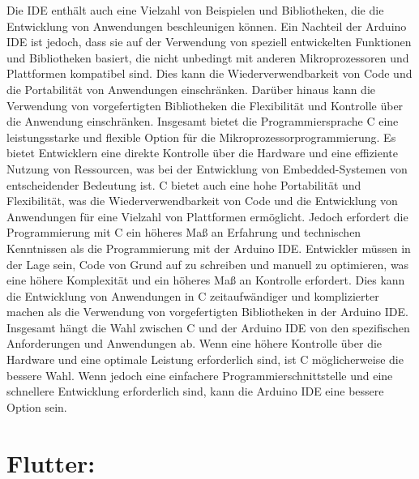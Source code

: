 Die IDE enthält auch eine Vielzahl von Beispielen und Bibliotheken, die die Entwicklung von Anwendungen beschleunigen können.
Ein Nachteil der Arduino IDE ist jedoch, dass sie auf der Verwendung von speziell entwickelten Funktionen und Bibliotheken basiert, die nicht unbedingt mit anderen Mikroprozessoren und Plattformen kompatibel sind. 
Dies kann die Wiederverwendbarkeit von Code und die Portabilität von Anwendungen einschränken. 
Darüber hinaus kann die Verwendung von vorgefertigten Bibliotheken die Flexibilität und Kontrolle über die Anwendung einschränken. 
Insgesamt bietet die Programmiersprache C eine leistungsstarke und flexible Option für die Mikroprozessorprogrammierung. 
Es bietet Entwicklern eine direkte Kontrolle über die Hardware und eine effiziente Nutzung von Ressourcen, was bei der Entwicklung von Embedded-Systemen von entscheidender Bedeutung ist. 
C bietet auch eine hohe Portabilität und Flexibilität, was die Wiederverwendbarkeit von Code und die Entwicklung von Anwendungen für eine Vielzahl von Plattformen ermöglicht.
Jedoch erfordert die Programmierung mit C ein höheres Maß an Erfahrung und technischen Kenntnissen als die Programmierung mit der Arduino IDE. Entwickler müssen in der Lage sein, Code von Grund auf zu schreiben und manuell zu optimieren, was eine höhere Komplexität und ein höheres Maß an Kontrolle erfordert. 
Dies kann die Entwicklung von Anwendungen in C zeitaufwändiger und komplizierter machen als die Verwendung von vorgefertigten Bibliotheken in der Arduino IDE.
Insgesamt hängt die Wahl zwischen C und der Arduino IDE von den spezifischen Anforderungen und Anwendungen ab. Wenn eine höhere Kontrolle über die Hardware und eine optimale Leistung erforderlich sind, ist C möglicherweise die bessere Wahl. 
Wenn jedoch eine einfachere Programmierschnittstelle und eine schnellere Entwicklung erforderlich sind, kann die Arduino IDE eine bessere Option sein.

\newpage

\section{Flutter:}

